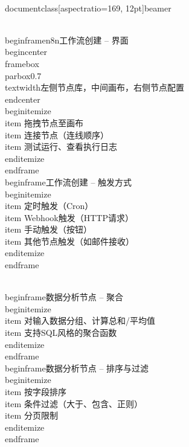 \\documentclass[aspectratio=169, 12pt]{beamer}
\begin{document}
\\begin{frame}{n8n工作流创建 – 界面}
\\begin{center}
\\framebox{\\parbox{0.7\\textwidth}{左侧节点库，中间画布，右侧节点配置}}
\\end{center}
\\begin{itemize}
\\item 拖拽节点至画布
\\item 连接节点（连线顺序）
\\item 测试运行、查看执行日志
\\end{itemize}
\\end{frame}
\\begin{frame}{工作流创建 – 触发方式}
\\begin{itemize}
\\item 定时触发（Cron）
\\item Webhook触发（HTTP请求）
\\item 手动触发（按钮）
\\item 其他节点触发（如邮件接收）
\\end{itemize}
\\end{frame}

\\begin{frame}{数据分析节点 – 聚合}
\\begin{itemize}
\\item 对输入数据分组、计算总和/平均值
\\item 支持SQL风格的聚合函数
\\end{itemize}
\\end{frame}
\\begin{frame}{数据分析节点 – 排序与过滤}
\\begin{itemize}
\\item 按字段排序
\\item 条件过滤（大于、包含、正则）
\\item 分页限制
\\end{itemize}
\\end{frame}
\end{document}
